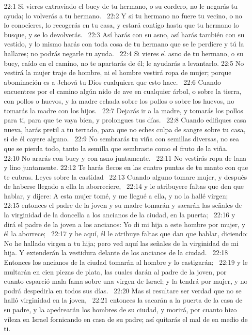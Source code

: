 22:1 Si vieres extraviado el buey de tu hermano, o su cordero, no le negarás tu ayuda; lo volverás a tu hermano.  
22:2 Y si tu hermano no fuere tu vecino, o no lo conocieres, lo recogerás en tu casa, y estará contigo hasta que tu hermano lo busque, y se lo devolverás.  
22:3 Así harás con su asno, así harás también con su vestido, y lo mismo harás con toda cosa de tu hermano que se le perdiere y tú la hallares; no podrás negarle tu ayuda.  
22:4 Si vieres el asno de tu hermano, o su buey, caído en el camino, no te apartarás de él; le ayudarás a levantarlo. 
22:5 No vestirá la mujer traje de hombre, ni el hombre vestirá ropa de mujer; porque abominación es a Jehová tu Dios cualquiera que esto hace.  
22:6 Cuando encuentres por el camino algún nido de ave en cualquier árbol, o sobre la tierra, con pollos o huevos, y la madre echada sobre los pollos o sobre los huevos, no tomarás la madre con los hijos.  
22:7 Dejarás ir a la madre, y tomarás los pollos para ti, para que te vaya bien, y prolongues tus días.  
22:8 Cuando edifiques casa nueva, harás pretil a tu terrado, para que no eches culpa de sangre sobre tu casa, si de él cayere alguno.  
22:9 No sembrarás tu viña con semillas diversas, no sea que se pierda todo, tanto la semilla que sembraste como el fruto de la viña.  
22:10 No ararás con buey y con asno juntamente.  
22:11 No vestirás ropa de lana y lino juntamente. 
22:12 Te harás flecos en las cuatro puntas de tu manto con que te cubras. 
Leyes sobre la castidad  
22:13 Cuando alguno tomare mujer, y después de haberse llegado a ella la aborreciere,  
22:14 y le atribuyere faltas que den que hablar, y dijere: A esta mujer tomé, y me llegué a ella, y no la hallé virgen;  
22:15 entonces el padre de la joven y su madre tomarán y sacarán las señales de la virginidad de la doncella a los ancianos de la ciudad, en la puerta;  
22:16 y dirá el padre de la joven a los ancianos: Yo di mi hija a este hombre por mujer, y él la aborrece;  
22:17 y he aquí, él le atribuye faltas que dan que hablar, diciendo: No he hallado virgen a tu hija; pero ved aquí las señales de la virginidad de mi hija. Y extenderán la vestidura delante de los ancianos de la ciudad.  
22:18 Entonces los ancianos de la ciudad tomarán al hombre y lo castigarán;  
22:19 y le multarán en cien piezas de plata, las cuales darán al padre de la joven, por cuanto esparció mala fama sobre una virgen de Israel; y la tendrá por mujer, y no podrá despedirla en todos sus días.  
22:20 Mas si resultare ser verdad que no se halló virginidad en la joven,  
22:21 entonces la sacarán a la puerta de la casa de su padre, y la apedrearán los hombres de su ciudad, y morirá, por cuanto hizo vileza en Israel fornicando en casa de su padre; así quitarás el mal de en medio de ti.  
